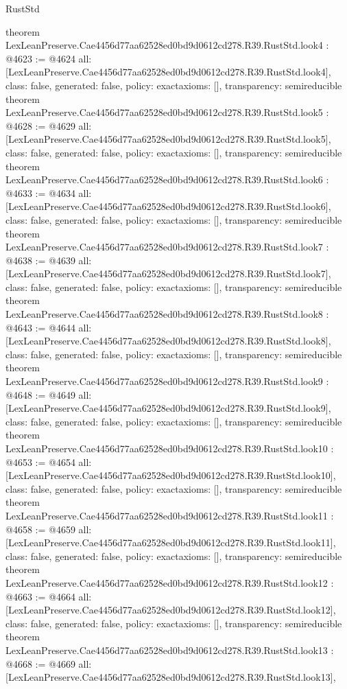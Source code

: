 \begin{lexlean}{RustStd}
\begin{coremodule}
{}
theorem LexLeanPreserve.Cae4456d77aa62528ed0bd9d0612cd278.R39.RustStd.look4 : @4623 := @4624 {
  all: [LexLeanPreserve.Cae4456d77aa62528ed0bd9d0612cd278.R39.RustStd.look4],
  class: false,
  generated: false,
  policy: exact{axioms: []},
  transparency: semireducible
}
theorem LexLeanPreserve.Cae4456d77aa62528ed0bd9d0612cd278.R39.RustStd.look5 : @4628 := @4629 {
  all: [LexLeanPreserve.Cae4456d77aa62528ed0bd9d0612cd278.R39.RustStd.look5],
  class: false,
  generated: false,
  policy: exact{axioms: []},
  transparency: semireducible
}
theorem LexLeanPreserve.Cae4456d77aa62528ed0bd9d0612cd278.R39.RustStd.look6 : @4633 := @4634 {
  all: [LexLeanPreserve.Cae4456d77aa62528ed0bd9d0612cd278.R39.RustStd.look6],
  class: false,
  generated: false,
  policy: exact{axioms: []},
  transparency: semireducible
}
theorem LexLeanPreserve.Cae4456d77aa62528ed0bd9d0612cd278.R39.RustStd.look7 : @4638 := @4639 {
  all: [LexLeanPreserve.Cae4456d77aa62528ed0bd9d0612cd278.R39.RustStd.look7],
  class: false,
  generated: false,
  policy: exact{axioms: []},
  transparency: semireducible
}
theorem LexLeanPreserve.Cae4456d77aa62528ed0bd9d0612cd278.R39.RustStd.look8 : @4643 := @4644 {
  all: [LexLeanPreserve.Cae4456d77aa62528ed0bd9d0612cd278.R39.RustStd.look8],
  class: false,
  generated: false,
  policy: exact{axioms: []},
  transparency: semireducible
}
theorem LexLeanPreserve.Cae4456d77aa62528ed0bd9d0612cd278.R39.RustStd.look9 : @4648 := @4649 {
  all: [LexLeanPreserve.Cae4456d77aa62528ed0bd9d0612cd278.R39.RustStd.look9],
  class: false,
  generated: false,
  policy: exact{axioms: []},
  transparency: semireducible
}
theorem LexLeanPreserve.Cae4456d77aa62528ed0bd9d0612cd278.R39.RustStd.look10 : @4653 := @4654 {
  all: [LexLeanPreserve.Cae4456d77aa62528ed0bd9d0612cd278.R39.RustStd.look10],
  class: false,
  generated: false,
  policy: exact{axioms: []},
  transparency: semireducible
}
theorem LexLeanPreserve.Cae4456d77aa62528ed0bd9d0612cd278.R39.RustStd.look11 : @4658 := @4659 {
  all: [LexLeanPreserve.Cae4456d77aa62528ed0bd9d0612cd278.R39.RustStd.look11],
  class: false,
  generated: false,
  policy: exact{axioms: []},
  transparency: semireducible
}
theorem LexLeanPreserve.Cae4456d77aa62528ed0bd9d0612cd278.R39.RustStd.look12 : @4663 := @4664 {
  all: [LexLeanPreserve.Cae4456d77aa62528ed0bd9d0612cd278.R39.RustStd.look12],
  class: false,
  generated: false,
  policy: exact{axioms: []},
  transparency: semireducible
}
theorem LexLeanPreserve.Cae4456d77aa62528ed0bd9d0612cd278.R39.RustStd.look13 : @4668 := @4669 {
  all: [LexLeanPreserve.Cae4456d77aa62528ed0bd9d0612cd278.R39.RustStd.look13],
}
\end{coremodule}
\end{lexlean}
